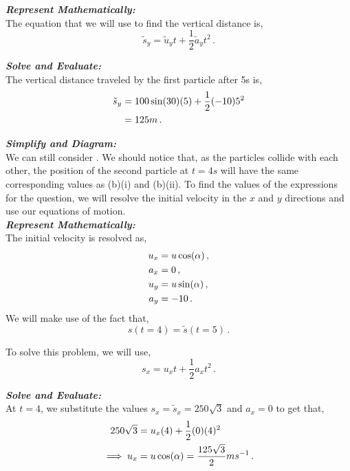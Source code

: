 \begin{subquestions}
\begin{subsubquestions}
\subsubquestion

\textbf{\textit{Represent Mathematically:}} \\			
The equation that we will use to find the vertical distance is,
\begin{equation}
	\tilde{s}_y =\tilde{u}_yt + \frac{1}{2}\tilde{a}_yt^2 \,.	
\end{equation}




\textbf{\textit{Solve and Evaluate:}} \\
The vertical distance traveled by the first particle after 5s is,
\begin{align}
	\tilde{s}_y & = 100\sin(30)(5) + \frac{1}{2}(-10)5^2 \nonumber \\
		& = 125m \,.
\end{align}


\subsubquestion

\textbf{\textit{Simplify and Diagram:}} \\
We can still consider . We should notice that, as the particles collide with each other, the position of the second particle at $t=4s$ will have the same corresponding values as (b)(i) and (b)(ii). To find the values of the expressions for the question, we will resolve the initial velocity in the $x$ and $y$ directions and use our equations of motion.\\




\textbf{\textit{Represent Mathematically:}} \\
The initial velocity is resolved as,
\begin{align}
	u_x & = u\cos(\alpha) \,, \nonumber \\
	a_x & = 0 \,, \nonumber \\
	u_y & = u\sin(\alpha) \,, \nonumber \\
	a_y & = -10 \,.
\end{align}
We will make use of the fact that,
\begin{equation}
	s(t=4) = \tilde{s}(t=5) \,.
\end{equation}

To solve this problem, we will use,
\begin{equation}
	s_x = u_xt + \frac{1}{2}a_xt^2 \,.
\end{equation}




\textbf{\textit{Solve and Evaluate:}} \\
At $t=4$, we substitute the values $s_x=\tilde{s}_x=250\sqrt{3}$ and $a_x=0$ to get that,
\begin{align}
	250\sqrt{3} & = u_x(4) + \frac{1}{2}(0)(4)^2 \nonumber \\
	\implies u_x & = u\cos(\alpha) = \frac{125\sqrt{3}}{2}ms^{-1} \,.
\end{align} 


\end{subsubquestions}
\end{subquestions}
